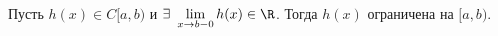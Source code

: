 
		Пусть $h(x)\in C[a,b)$ и $\exists\ \lim\limits_{x\to b-0}h(x)\in\R$. Тогда $h(x)$ ограничена на $[a,b)$.
	
